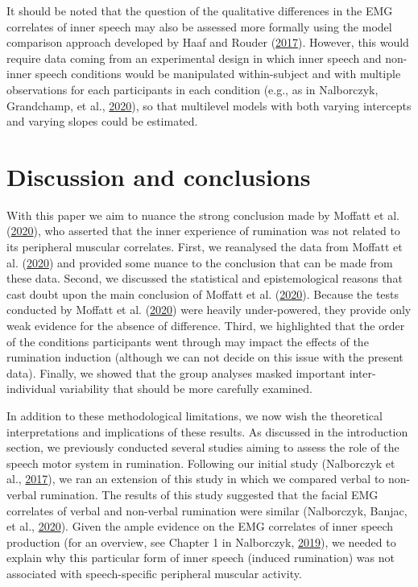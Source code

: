 \documentclass[
  english,
  man, donotrepeattitle,floatsintext]{apa6}
\begin{document}
It should be noted that the question of the qualitative differences in the EMG correlates of inner speech may also be assessed more formally using the model comparison approach developed by Haaf and Rouder (\protect\hyperlink{ref-haaf_developing_2017}{2017}). However, this would require data coming from an experimental design in which inner speech and non-inner speech conditions would be manipulated within-subject and with multiple observations for each participants in each condition (e.g., as in Nalborczyk, Grandchamp, et al., \protect\hyperlink{ref-nalborczyk_can_2020}{2020}), so that multilevel models with both varying intercepts and varying slopes could be estimated.

\hypertarget{discussion-and-conclusions}{%
\section{Discussion and conclusions}\label{discussion-and-conclusions}}

With this paper we aim to nuance the strong conclusion made by Moffatt et al. (\protect\hyperlink{ref-moffatt_inner_2020}{2020}), who asserted that the inner experience of rumination was not related to its peripheral muscular correlates. First, we reanalysed the data from Moffatt et al. (\protect\hyperlink{ref-moffatt_inner_2020}{2020}) and provided some nuance to the conclusion that can be made from these data. Second, we discussed the statistical and epistemological reasons that cast doubt upon the main conclusion of Moffatt et al. (\protect\hyperlink{ref-moffatt_inner_2020}{2020}). Because the tests conducted by Moffatt et al. (\protect\hyperlink{ref-moffatt_inner_2020}{2020}) were heavily under-powered, they provide only weak evidence for the absence of difference. Third, we highlighted that the order of the conditions participants went through may impact the effects of the rumination induction (although we can not decide on this issue with the present data). Finally, we showed that the group analyses masked important inter-individual variability that should be more carefully examined.

In addition to these methodological limitations, we now wish the theoretical interpretations and implications of these results. As discussed in the introduction section, we previously conducted several studies aiming to assess the role of the speech motor system in rumination. Following our initial study (Nalborczyk et al., \protect\hyperlink{ref-nalborczyk_orofacial_2017}{2017}), we ran an extension of this study in which we compared verbal to non-verbal rumination. The results of this study suggested that the facial EMG correlates of verbal and non-verbal rumination were similar (Nalborczyk, Banjac, et al., \protect\hyperlink{ref-nalborczyk_dissociating_2020}{2020}). Given the ample evidence on the EMG correlates of inner speech production (for an overview, see Chapter 1 in Nalborczyk, \protect\hyperlink{ref-nalborczyk_understanding_2019}{2019}), we needed to explain why this particular form of inner speech (induced rumination) was not associated with speech-specific peripheral muscular activity.
\end{document}
